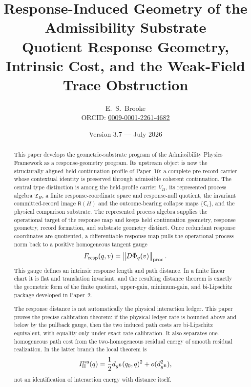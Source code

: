 \documentclass[11pt]{article}
\title{Response-Induced Geometry of the Admissibility Substrate\\
\large Quotient Response Geometry, Intrinsic Cost, and the Weak-Field Trace Obstruction}
\author{E.\ S.\ Brooke \\[0.4em] \normalsize ORCID: \href{https://orcid.org/0009-0001-2261-4682}{0009-0001-2261-4682}}
\date{Version 3.7 --- July 2026}
\theoremstyle{remark}
\newcommand{\Fresp}{F_{\rm resp}}
\newcommand{\VH}{V_H}
\newcommand{\Tproc}{\mathfrak T_H}
\begin{document}
\maketitle

\begin{abstract}
This paper develops the geometric-substrate program of the Admissibility Physics Framework as a response-geometry program.  Its upstream object is now the structurally aligned held continuation profile of Paper~10: a complete pre-record carrier whose contextual identity is preserved through admissible coherent continuation.  The central type distinction is among the held-profile carrier $\VH$, its represented process algebra $\Tproc$, a finite response-coordinate space and response-null quotient, the invariant committed-record image $\mathsf R(H)$ and the outcome-bearing collapse maps $\{\mathsf C_i\}$, and the physical comparison substrate.  The represented process algebra supplies the operational target of the response map and keeps held continuation geometry, response geometry, record formation, and substrate geometry distinct.  Once redundant response coordinates are quotiented, a differentiable response map pulls the operational process norm back to a positive homogeneous tangent gauge
\[
        \Fresp(q,v)
        =\left\|D\bar\Phi_q(v)\right\|_{\rm proc}.
\]
This gauge defines an intrinsic response length and path distance.  In a finite linear chart it is flat and translation invariant, and the resulting distance theorem is exactly the geometric form of the finite quotient, upper-gain, minimum-gain, and bi-Lipschitz package developed in Paper~2.

The response distance is not automatically the physical interaction ledger.  This paper proves the precise calibration theorem: if the physical ledger rate is bounded above and below by the pullback gauge, then the two induced path costs are bi-Lipschitz equivalent, with equality only under exact rate calibration.  It also separates one-homogeneous path cost from the two-homogeneous residual energy of smooth residual realization.  In the latter branch the local theorem is
\[
        I_{\Pi}^{\rm res}(q)
        =\frac12 d_{g^{\rm E}}(q_0,q)^2+o(d_{g^{\rm E}}^2),
\]
not an identification of interaction energy with distance itself.


\end{abstract}
\end{document}
